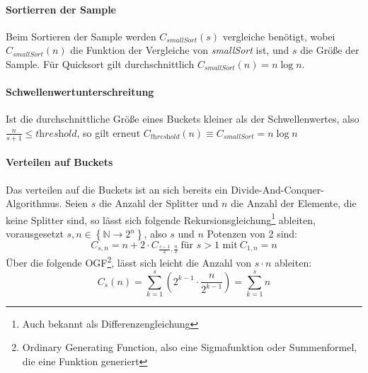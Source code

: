 		\paragraph{Sortierren der Sample}
			Beim Sortieren der Sample werden $C_\textit{smallSort}(s)$ vergleiche benötigt, wobei $C_\textit{smallSort}(n)$ die Funktion der Vergleiche von \textit{smallSort} ist, und $s$ die Größe der Sample.
			Für Quicksort gilt durchschnittlich $C_\textit{smallSort}(n)=n\log{n}$. \autocite{wikipedia-contributors-2022A}
			
		\paragraph{Schwellenwertunterschreitung}
			Ist die durchschnittliche Größe eines Buckets kleiner als der Schwellenwertes, also $\frac{n}{s+1}\leq \textit{threshold}$, so gilt erneut $C_\textit{threshold}(n)\equiv C_\textit{smallSort}=n\log{n}$
		
		\paragraph{Verteilen auf Buckets}
			Das verteilen auf die Buckets ist an sich bereits ein Divide-And-Conquer-Algorithmus.
			Seien $s$ die Anzahl der Splitter und $n$ die Anzahl der Elemente, die keine Splitter sind, so lässt sich folgende Rekursionsgleichung\footnote{Auch bekannt als Differenzengleichung} ableiten, vorausgesetzt $s,n\in \left\{ \mathbb{N}\to 2^n \right\}$, also $s$ und $n$ Potenzen von 2 sind:
			\begin{equation}
				C_{s,n}=n+2\cdot C_{\frac{s-1}{2}, \frac{n}{2}}\ \text{für $s>1$ mit}\ C_{1,n}=n
			\end{equation}
			Über die folgende OGF\footnote{Ordinary Generating Function, also eine Sigmafunktion oder Summenformel, die eine Funktion generiert}, lässt sich leicht die Anzahl von $s\cdot n$ ableiten:
			\begin{equation}
				C_s(n)=\sum_{k=1}^{s}\left(2^{k-1}\cdot \frac{n}{2^{k-1}}\right)=\sum_{k=1}^{s}n
			\end{equation}
